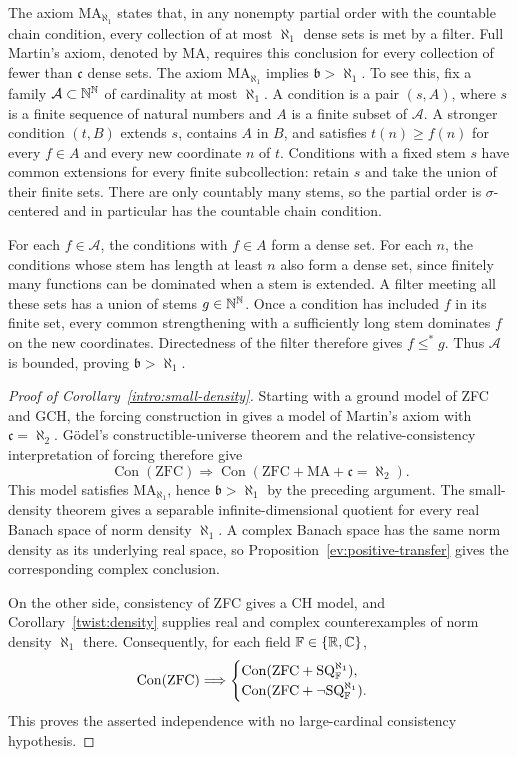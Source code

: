 The axiom $\mathrm{MA}_{\aleph_1}$ states that, in any nonempty partial order with
the countable chain condition, every collection of at most $\aleph_1$
dense sets is met by a filter. Full Martin's axiom, denoted by
$\mathrm{MA}$, requires this conclusion for every collection of fewer
than $\mathfrak c$ dense sets. The axiom $\mathrm{MA}_{\aleph_1}$ implies
$\mathfrak b>\aleph_1$.
To see this, fix a family $\mathcal A\subset\mathbb N^{\mathbb N}$ of cardinality at
most $\aleph_1$. A condition is a pair $(s,A)$, where $s$ is a finite
sequence of natural numbers and $A$ is a finite subset of $\mathcal A$.
A stronger condition $(t,B)$ extends $s$, contains $A$ in $B$, and
satisfies $t(n)\ge f(n)$ for every $f\in A$ and every new coordinate
$n$ of $t$. Conditions with a fixed stem $s$ have common extensions for
every finite subcollection: retain $s$ and take the union of their
finite sets. There are only countably many stems, so the partial order
is $\sigma$-centered and in particular has the countable chain condition.

For each $f\in\mathcal A$, the conditions with $f\in A$ form a dense
set. For each $n$, the conditions whose stem has length at least $n$
also form a dense set, since finitely many functions can be dominated
when a stem is extended. A filter meeting all these sets has a union
of stems $g\in\mathbb N^{\mathbb N}$. Once a condition has included $f$ in its finite
set, every common strengthening with a sufficiently long stem dominates
$f$ on the new coordinates. Directedness of the filter therefore gives
$f\leq^*g$. Thus $\mathcal A$ is bounded, proving
$\mathfrak b>\aleph_1$.

\begin{proof}[Proof of Corollary~\ref{intro:small-density}]
Starting with a ground model of ZFC and GCH, the forcing construction in
\cite[Chapter~VIII, Theorem~6.3]{Kunen1980} gives a model of Martin's
axiom with $\mathfrak c=\aleph_2$. G\"odel's constructible-universe theorem
and the relative-consistency interpretation of forcing therefore give
\[
 \operatorname{Con}(\mathrm{ZFC})\Longrightarrow
 \operatorname{Con}(\mathrm{ZFC}+\mathrm{MA}+\mathfrak c=\aleph_2).
\]
This model satisfies $\mathrm{MA}_{\aleph_1}$, hence
$\mathfrak b>\aleph_1$ by the preceding argument. The small-density
theorem gives a separable infinite-dimensional quotient for every real
Banach space of norm density $\aleph_1$. A complex Banach space has the
same norm density as its underlying real space, so
Proposition~\ref{ev:positive-transfer} gives the corresponding complex
conclusion.

On the other side, consistency of ZFC gives a CH model, and
Corollary~\ref{twist:density} supplies real and complex counterexamples
of norm density $\aleph_1$ there. Consequently, for each field
$\mathbb F\in\{\mathbb R,\mathbb C\}$,
\[
 \operatorname{Con}(\mathrm{ZFC})\Longrightarrow
 \begin{cases}
 \operatorname{Con}(\mathrm{ZFC}+\mathrm{SQ}^{\aleph_1}_{\mathbb F}),\\
 \operatorname{Con}(\mathrm{ZFC}+\neg\mathrm{SQ}^{\aleph_1}_{\mathbb F}).
 \end{cases}
\]
This proves the asserted independence with no large-cardinal consistency
hypothesis.
\end{proof}

